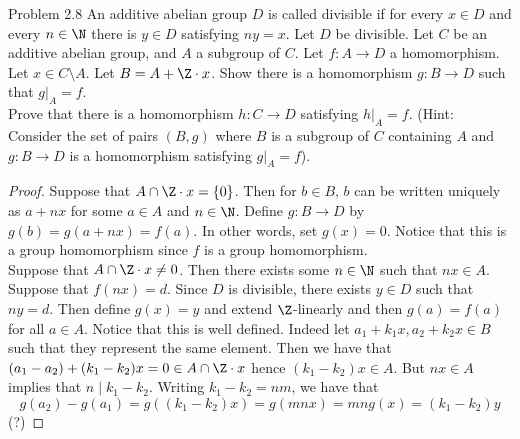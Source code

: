 \documentclass[a4paper]{article}
\begin{document}
\begin{ex}{Problem 2.8}{} An additive abelian group $D$ is called divisible if for every $x\in D$ and every $n\in\N$ there is $y\in D$ satisfying $ny=x$. Let $D$ be divisible. Let $C$ be an additive abelian group, and $A$ a subgroup of $C$. Let $f:A\to D$ a homomorphism. Let $x\in C\setminus A$. Let $B=A+\Z\cdot x$. Show there is a homomorphism $g:B\to D$ such that $g|_A=f$. \\

Prove that there is a homomorphism $h:C\to D$ satisfying $h|_A=f$. (Hint: Consider
the set of pairs $(B,g)$ where $B$ is a subgroup of $C$ containing $A$ and $g:B\to D$ is a
homomorphism satisfying $g|_A=f$). 
\begin{proof}
Suppose that $A\cap\Z\cdot x=\{0\}$. Then for $b\in B$, $b$ can be written uniquely as $a+nx$ for some $a\in A$ and $n\in\N$. Define $g:B\to D$ by $g(b)=g(a+nx)=f(a)$. In other words, set $g(x)=0$. Notice that this is a group homomorphism since $f$ is a group homomorphism. \\

Suppose that $A\cap\Z\cdot x\neq 0$. Then there exists some $n\in\N$ such that $nx\in A$. Suppose that $f(nx)=d$. Since $D$ is divisible, there exists $y\in D$ such that $ny=d$. Then define $g(x)=y$ and extend $\Z$-linearly and then $g(a)=f(a)$ for all $a\in A$. Notice that this is well defined. Indeed let $a_1+k_1x,a_2+k_2x\in B$ such that they represent the same element. Then we have that $(a_1-a_2)+(k_1-k_2)x=0\in A\cap\Z\cdot x$ hence $(k_1-k_2)x\in A$. But $nx\in A$ implies that $n\;|\;k_1-k_2$. Writing $k_1-k_2=nm$, we have that $$g(a_2)-g(a_1)=g((k_1-k_2)x)=g(mnx)=mng(x)=(k_1-k_2)y$$ (?)
\end{proof}
\end{ex}
\end{document}
